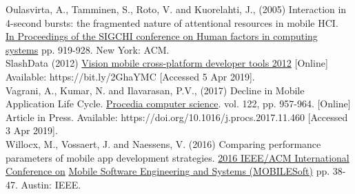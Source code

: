 \documentclass[version=last,fontsize=13pt]{scrartcl}
\begin{document}
Oulasvirta, A., Tamminen, S., Roto, V. and Kuorelahti, J., (2005) Interaction in 4-second bursts: the fragmented nature of attentional resources in mobile HCI. \\
\underline{In Proceedings of the SIGCHI conference on Human factors in computing systems} pp. 919-928. New York: ACM. \\

SlashData (2012) \underline{Vision mobile cross-platform developer tools 2012}  [Online] Available: https://bit.ly/2GhaYMC [Accessed 5 Apr 2019].\\

Vagrani, A., Kumar, N. and Ilavarasan, P.V., (2017) Decline in Mobile Application Life Cycle. \underline{Procedia computer science}. vol. 122, pp. 957-964. [Online] Article in Press. Available: https://doi.org/10.1016/j.procs.2017.11.460 [Accessed 3 Apr 2019].\\

Willocx, M., Vossaert, J. and Naessens, V. (2016) Comparing performance parameters of mobile app development strategies.  \underline{2016 IEEE/ACM International Conference on} \underline{Mobile Software Engineering and Systems (MOBILESoft)} pp. 38-47.  Austin: IEEE.\\
\end{document}
